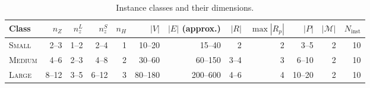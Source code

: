 \begin{table}[ht]
\centering
\caption{Instance classes and their dimensions.}
\label{tab:instance-classes}
\small
\begin{tabular}{lrrrrrrrrrrr}
\toprule
\textbf{Class}
  & $n_Z$ & $n^L_z$ & $n^S_z$ & $n_H$ & $|V|$ & $|E|$ (approx.)
  & $|R|$ & $\max|R_p|$ & $|P|$ & $|\mathcal{M}|$ & $N_{\text{inst}}$ \\
\midrule
\textsc{Small}
  & 2--3  & 1--2  & 2--4  & 1 & 10--20  & 15--40
  & 2     & 2  & 3--5  & 2 & 10 \\
\textsc{Medium}
  & 4--6  & 2--3  & 4--8  & 2 & 30--60  & 60--150
  & 3--4  & 3  & 6--10 & 2 & 10 \\
\textsc{Large}
  & 8--12 & 3--5  & 6--12 & 3 & 80--180 & 200--600
  & 4--6  & 4  & 10--20 & 2 & 10 \\
\bottomrule
\end{tabular}
\end{table}

